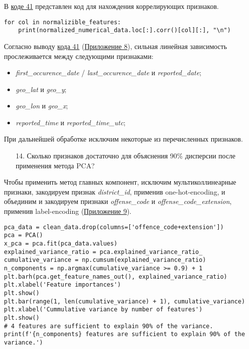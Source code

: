 В \hyperref[code:41]{коде 41} представлен код для нахождения коррелирующих признаков.

\begin{code}
\begin{verbatim}
for col in normalizible_features:
    print(normalized_numerical_data.loc[:].corr()[col][:], "\n")
\end{verbatim}
\label{code:41}
\end{code}

Согласно выводу \hyperref[code:41]{кода 41} (\hyperref[appendix:8]{Приложение 8}), сильная линейная зависимость прослеживается между следующими признаками:
\begin{itemize}
    \item \textit{first\_occurence\_date} / \textit{last\_occurence\_date} и \textit{reported\_date};
    \item \textit{geo\_lat} и \textit{geo\_y};
    \item \textit{geo\_lon} и \textit{geo\_x};
    \item \textit{reported\_time} и \textit{reported\_time\_utc};
\end{itemize}

При дальнейшей обработке исключим некоторые из перечисленных признаков.

\begin{enumerate}
    \item[14.] Сколько признаков достаточно для объяснения 90\% дисперсии после применения метода PCA?
\end{enumerate}

Чтобы применить метод главных компонент, исключим мультиколлинеарные признаки, закодируем признак \textit{district\_id}, применив one-hot-encoding, и объединим и закодируем признаки \textit{offense\_code} и \textit{offense\_code\_extension}, применив label-encoding (\hyperref[appendix:9]{Приложение 9}).

\begin{code}
\begin{verbatim}
pca_data = clean_data.drop(columns=['offence_code+extension'])
pca = PCA()
x_pca = pca.fit(pca_data.values)
explained_variance_ratio = pca.explained_variance_ratio_
cumulative_variance = np.cumsum(explained_variance_ratio)
n_components = np.argmax(cumulative_variance >= 0.9) + 1
plt.barh(pca.get_feature_names_out(), explained_variance_ratio)
plt.xlabel('Feature importances')
plt.show()
plt.bar(range(1, len(cumulative_variance) + 1), cumulative_variance)
plt.xlabel('Cummulative variance by number of features')
plt.show()
# 4 features are sufficient to explain 90% of the variance.
print(f'{n_components} features are sufficient to explain 90% of the variance.')
\end{verbatim}
\label{code:42}
\end{code}

